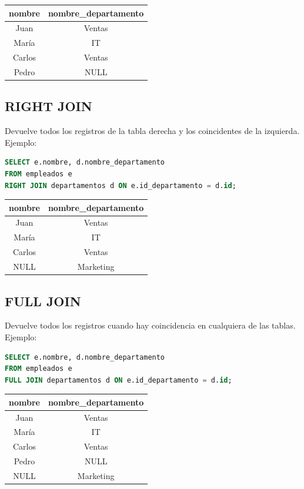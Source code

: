\documentclass[12pt]{article}
\begin{document}
\begin{center}
\begin{tabular}{cc}
\toprule
nombre & nombre\_departamento \\
\midrule
Juan & Ventas \\
María & IT \\
Carlos & Ventas \\
Pedro & NULL \\
\bottomrule
\end{tabular}
\end{center}

\subsection{RIGHT JOIN}
Devuelve todos los registros de la tabla derecha y los coincidentes de la izquierda. Ejemplo:
\begin{lstlisting}[language=SQL]
SELECT e.nombre, d.nombre_departamento
FROM empleados e
RIGHT JOIN departamentos d ON e.id_departamento = d.id;
\end{lstlisting}

\begin{center}
\begin{tabular}{cc}
\toprule
nombre & nombre\_departamento \\
\midrule
Juan & Ventas \\
María & IT \\
Carlos & Ventas \\
NULL & Marketing \\
\bottomrule
\end{tabular}
\end{center}

\subsection{FULL JOIN}
Devuelve todos los registros cuando hay coincidencia en cualquiera de las tablas. Ejemplo:
\begin{lstlisting}[language=SQL]
SELECT e.nombre, d.nombre_departamento
FROM empleados e
FULL JOIN departamentos d ON e.id_departamento = d.id;
\end{lstlisting}

\begin{center}
\begin{tabular}{cc}
\toprule
nombre & nombre\_departamento \\
\midrule
Juan & Ventas \\
María & IT \\
Carlos & Ventas \\
Pedro & NULL \\
NULL & Marketing \\
\bottomrule
\end{tabular}
\end{center}
\end{document}
